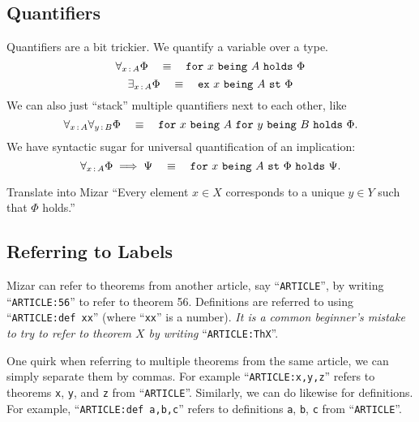 \subsection{Quantifiers}
Quantifiers are a bit trickier. We quantify a variable over a type.
\begin{equation}
\forall_{x\mathop{:}\nolimits A}\Phi\quad\equiv\quad\mathtt{for}~x~\mathtt{being}~A~\mathtt{holds}~\Phi
\end{equation}
\begin{equation}
\exists_{x\mathop{:}\nolimits A}\Phi\quad\equiv\quad\mathtt{ex}~x~\mathtt{being}~A~\mathtt{st}~\Phi
\end{equation}
We can also just ``stack'' multiple quantifiers next to each other, like
\begin{equation}
\forall_{x\mathop{:}\nolimits A}\forall_{y\mathop{:}\nolimits B}\Phi\quad\equiv\quad\mathtt{for}~x~\mathtt{being}~A~\mathtt{for}~y~\mathtt{being}~B~\mathtt{holds}~\Phi.
\end{equation}
We have syntactic sugar for universal quantification of an implication:
\begin{equation}
\forall_{x\mathop{:}\nolimits A}\Phi\implies\Psi\quad\equiv\quad\mathtt{for}~x~\mathtt{being}~A~\mathtt{st}~\Phi~\mathtt{holds}~\Psi.
\end{equation}

\begin{exercise}
  Translate into Mizar ``Every element $x\in X$ corresponds to a unique
  $y\in Y$ such that $\Phi$ holds.''
\end{exercise}

\subsection{Referring to Labels}\label{par:introduction:referring-to-labels}
Mizar can refer to theorems from another article, say
``\verb#ARTICLE#'', by writing ``\verb#ARTICLE:56#'' to refer to theorem 56.
Definitions are referred to using ``\verb#ARTICLE:def xx#'' (where
``\verb#xx#'' is a number). \emph{It is a common beginner's mistake to
try to refer to theorem $X$ by writing } ``\verb#ARTICLE:ThX#''.

One quirk when referring to multiple theorems from the same article, we
can simply separate them by commas. For example ``\verb#ARTICLE:x,y,z#''
refers to theorems {\tt x}, {\tt y}, and {\tt z} from ``\verb#ARTICLE#''.
Similarly, we can do likewise for definitions. For example,
``\verb#ARTICLE:def a,b,c#'' refers to definitions {\tt a}, {\tt b},
{\tt c} from ``\verb#ARTICLE#''.


